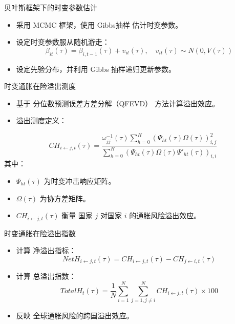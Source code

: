 \documentclass{beamer}
\begin{document}
\begin{frame}{贝叶斯框架下的时变参数估计}
  \begin{itemize}
      \item 采用 MCMC 框架，使用 Gibbs抽样 估计时变参数。
      \item 设定时变参数服从随机游走：
      \begin{equation}
          \beta_{it}(\tau) = \beta_{i, t-1}(\tau) + v_{it}(\tau), \quad v_{it}(\tau) \sim N(0, V(\tau))
      \end{equation}
      \item 设定先验分布，并利用 Gibbs 抽样递归更新参数。
  \end{itemize}
\end{frame}

\begin{frame}{时变通胀在险溢出测度}
  \begin{itemize}
      \item 基于 分位数预测误差方差分解（QFEVD） 方法计算溢出效应。
      \item 溢出测度定义：
  \end{itemize}
  \begin{equation}
      CH_{i \leftarrow j, t}(\tau) = \frac{\omega_{jj}^{-1}(\tau) \sum_{h=0}^{H} \left( \Psi_{ht}(\tau) \Omega(\tau) \right)_{i,j}^2 }{\sum_{h=0}^{H} \left( \Psi_{ht}(\tau) \Omega(\tau) \Psi'_{ht}(\tau) \right)_{i,i}}
  \end{equation}
  其中：
  \begin{itemize}
      \item \( \Psi_{ht}(\tau) \) 为时变冲击响应矩阵。
      \item \( \Omega(\tau) \) 为协方差矩阵。
      \item \( CH_{i \leftarrow j, t}(\tau) \) 衡量 国家 \( j \) 对国家 \( i \) 的通胀风险溢出效应。
  \end{itemize}
\end{frame}

\begin{frame}{时变通胀在险溢出指数}
  \begin{itemize}
      \item 计算 净溢出指标：
      \begin{equation}
          NetH_{i \leftarrow j, t}(\tau) = CH_{i \leftarrow j, t}(\tau) - CH_{j \leftarrow i, t}(\tau)
      \end{equation}
      \item 计算 总溢出指数：
      \begin{equation}
          TotalH_t(\tau) = \frac{1}{N} \sum_{i=1}^{N} \sum_{j=1, j \neq i}^{N} CH_{i \leftarrow j, t}(\tau) \times 100
      \end{equation}
      \item 反映 全球通胀风险的跨国溢出效应。
  \end{itemize}
\end{frame}
\end{document}
